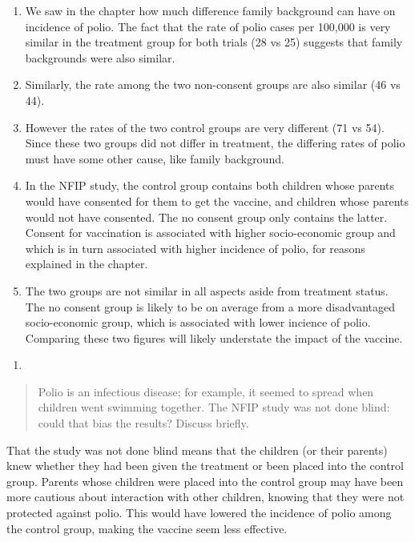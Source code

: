 \documentclass[
]{book}
\providecommand{\tightlist}{%
  \setlength{\itemsep}{0pt}\setlength{\parskip}{0pt}}
\begin{document}
\begin{enumerate}
\def\labelenumi{\alph{enumi}.}
\item
  We saw in the chapter how much difference family background can have on incidence of polio. The fact that the rate of polio cases per 100,000 is very similar in the treatment group for both trials (28 vs 25) suggests that family backgrounds were also similar.
\item
  Similarly, the rate among the two non-consent groups are also similar (46 vs 44).
\item
  However the rates of the two control groups are very different (71 vs 54). Since these two groups did not differ in treatment, the differing rates of polio must have some other cause, like family background.
\item
  In the NFIP study, the control group contains both children whose parents would have consented for them to get the vaccine, and children whose parents would not have consented. The no consent group only contains the latter. Consent for vaccination is associated with higher socio-economic group and which is in turn associated with higher incidence of polio, for reasons explained in the chapter.
\item
  The two groups are not similar in all aspects aside from treatment status. The no consent group is likely to be on average from a more disadvantaged socio-economic group, which is associated with lower incience of polio. Comparing these two figures will likely understate the impact of the vaccine.
\end{enumerate}

\begin{enumerate}
\def\labelenumi{\arabic{enumi}.}
\setcounter{enumi}{2}
\tightlist
\item
\end{enumerate}

\begin{quote}
Polio is an infectious disease; for example, it seemed to spread when children went swimming together. The NFIP study was not done blind: could that bias the results? Discuss briefly.
\end{quote}

That the study was not done blind means that the children (or their parents) knew whether they had been given the treatment or been placed into the control group. Parents whose children were placed into the control group may have been more cautious about interaction with other children, knowing that they were not protected against polio. This would have lowered the incidence of polio among the control group, making the vaccine seem less effective.
\end{document}
